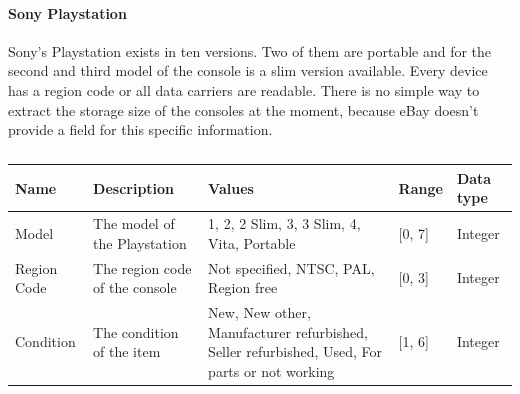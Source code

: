 \paragraph{Sony Playstation}
Sony's Playstation exists in ten versions. Two of them are portable and for the second and third model of the console is a slim version available. Every device has a region code or all data carriers are readable. There is no simple way to extract the storage size of the consoles at the moment, because eBay doesn't provide a field for this specific information.
\begin{table}[h!]
	\begin{center}
	\begin{tabular}{| l | p{5cm} | p{4cm} | l | l |}
		\hline
		Name & Description & Values & Range & Data type \\
		\hline
		Model & The model of the Playstation & 1, 2, 2 Slim, 3, 3 Slim, 4, Vita, Portable & [0, 7] & Integer \\
		\hline
		Region Code & The region code of the console & Not specified, NTSC, PAL, Region free & [0, 3] & Integer \\
		\hline
		Condition & The condition of the item & New, New other, Manufacturer refurbished, Seller refurbished, Used, For parts or not working & [1, 6] & Integer \\
		\hline
	\end{tabular}
	\end{center}
	\caption{}
\end{table}


